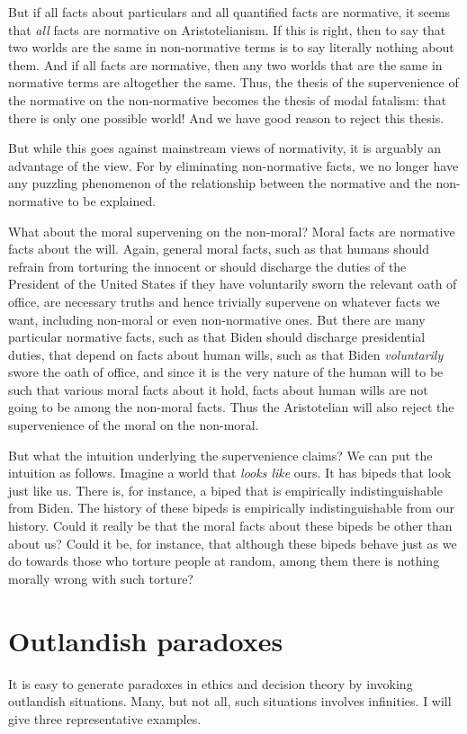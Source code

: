 But if all facts about particulars and all quantified facts are normative, it seems that \textit{all} facts
are normative on Aristotelianism.  If this is right, then to say that two worlds are the same in non-normative terms 
is to say literally nothing about them. And if all facts are normative, then any two worlds that are the same
in normative terms are altogether the same. Thus, the thesis of the supervenience of the normative on the
non-normative becomes the thesis of modal fatalism: that there is only one possible world! And we have good
reason to reject this thesis.

But while this goes against mainstream views of normativity, it is arguably an advantage of the
view. For by eliminating non-normative facts, we no longer have any puzzling phenomenon of the relationship 
between the normative and the non-normative to be explained. 

What about the moral supervening on the non-moral? Moral facts are normative facts about the
will. Again, general moral facts, such as that humans should refrain from torturing the innocent or should
discharge the duties of the President of the United States if they have voluntarily sworn the
relevant oath of office,
are necessary truths and hence trivially supervene on whatever facts we want, including
non-moral or even non-normative ones. But there are many particular normative facts, such as
that Biden should discharge presidential duties, that depend on facts about human wills,
such as that Biden \textit{voluntarily} swore the oath of office, and since it is the very nature
of the
human will to be such that various moral facts about it hold, facts about human wills are not going
to be among the non-moral facts. Thus the Aristotelian will also reject the supervenience of the
moral on the non-moral.

But what the intuition underlying the supervenience claims? We can put the intuition as follows.
Imagine a world that \textit{looks like} ours. It has bipeds that look just like us. There is,
for instance, a biped that is empirically indistinguishable from Biden. The history of these bipeds
is empirically indistinguishable from our history. Could it really be that the moral facts about
these bipeds be other than about us? Could it be, for instance, that although these bipeds behave just
as we do towards those who torture people at random, among them there is nothing morally wrong with
such torture?

\section{Outlandish paradoxes}
It is easy to generate paradoxes in ethics and decision theory by invoking outlandish situations.
Many, but not all, such situations involves infinities. I will give three representative examples.

